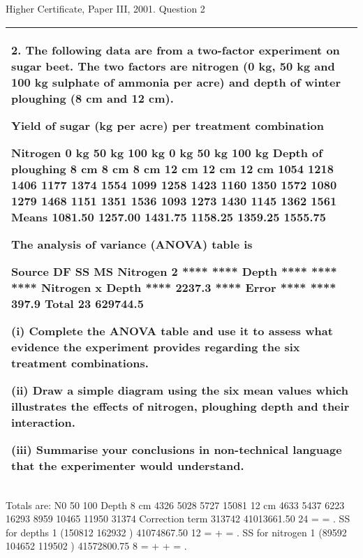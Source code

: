 \documentclass[a4paper,12pt]{article}
\begin{document}


Higher Certificate, Paper III, 2001. Question 2

\begin{table}[ht!]
     


\centering
     


\begin{tabular}{|p{15cm}|}
     


\hline 


2. The following data are from a two-factor experiment on sugar beet.  The two factors are nitrogen (0 kg, 50 kg and 100 kg sulphate of ammonia per acre) and depth of winter ploughing (8 cm and 12 cm). 
 
 
Yield of sugar (kg per acre) per treatment combination 
 
Nitrogen 0 kg 50 kg 100 kg 0 kg 50 kg 100 kg Depth of ploughing 8 cm 8 cm 8 cm 12 cm 12 cm 12 cm 1054 1218 1406 1177 1374 1554 1099 1258 1423 1160 1350 1572 1080 1279 1468 1151 1351 1536 1093 1273 1430 1145 1362 1561 Means 1081.50 1257.00 1431.75 1158.25 1359.25 1555.75 
 
 
 
The analysis of variance (ANOVA) table is 
 
Source DF SS MS 
Nitrogen 2 **** **** 
Depth **** **** **** 
Nitrogen x Depth **** 2237.3 **** 
Error **** **** 397.9 
Total 23 629744.5  
 
(i) Complete the ANOVA table and use it to assess what evidence the experiment provides regarding the six treatment combinations.
 
(ii) Draw a simple diagram using the six mean values which illustrates the effects of nitrogen, ploughing depth and their interaction.  
 
(iii) Summarise your conclusions in non-technical language that the experimenter would understand.  
 
\\ \hline
\end{tabular}
\end{table}

Totals are:
N0 50 100
Depth 8 cm 4326 5028 5727 15081 12 cm 4633 5437 6223 16293
8959 10465 11950 31374
Correction term
313742 41013661.50
24
= = .
SS for depths 1 (150812 162932 ) 41074867.50
12
= + = .
SS for nitrogen 1 (89592 104652 119502 ) 41572800.75
8
= + + = .
\end{document}
